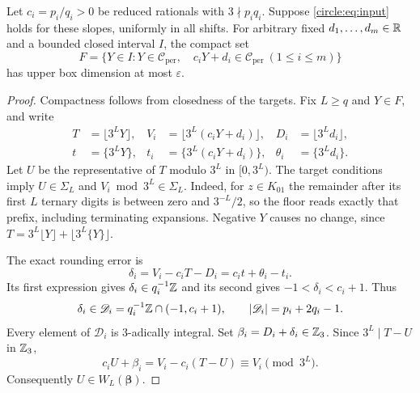 \begin{lemma}\label{circle:lem:transfer}
Let $c_i=p_i/q_i>0$ be reduced rationals with $3\nmid p_iq_i$.
Suppose \eqref{circle:eq:input} holds for these slopes, uniformly in
all shifts. For arbitrary fixed $d_1,\ldots,d_m\in\mathbb R$ and a bounded
closed interval $I$, the compact set
\[
 F=\{Y\in I:Y\in\mathcal C_{\mathrm{per}},\quad
             c_iY+d_i\in\mathcal C_{\mathrm{per}}\ (1\le i\le m)\}
\]
has upper box dimension at most $\varepsilon$.
\end{lemma}

\begin{proof}
Compactness follows from closedness of the targets. Fix $L\ge q$ and
$Y\in F$, and write
\begin{align*}
 T&=\lfloor3^LY\rfloor,&
 V_i&=\lfloor3^L(c_iY+d_i)\rfloor,&D_i&=\lfloor3^Ld_i\rfloor,\\
 t&=\{3^LY\},&t_i&=\{3^L(c_iY+d_i)\},&\theta_i&=\{3^Ld_i\}.
\end{align*}
Let $U$ be the representative of $T$ modulo $3^L$ in $[0,3^L)$.
The target conditions imply
$U\in\Sigma_L$ and $V_i\bmod 3^L\in\Sigma_L$.
Indeed, for $z\in K_{01}$ the remainder after its first $L$ ternary
digits is between zero and $3^{-L}/2$, so the floor reads exactly
that prefix, including terminating expansions. Negative $Y$ causes
no change, since
$T=3^L\lfloor Y\rfloor+\lfloor3^L\{Y\}\rfloor$.

The exact rounding error is
\begin{equation}\label{circle:eq:error}
 \delta_i=V_i-c_iT-D_i=c_it+\theta_i-t_i.
\end{equation}
Its first expression gives $\delta_i\in q_i^{-1}\mathbb Z$ and its second
gives $-1<\delta_i<c_i+1$. Thus
\[
 \delta_i\in\mathscr D_i=q_i^{-1}\mathbb Z\cap(-1,c_i+1),
 \qquad |\mathscr D_i|=p_i+2q_i-1.
\]
Every element of $\mathscr D_i$ is $3$-adically integral. Set
$\beta_i=D_i+\delta_i\in\mathbb Z_3$. Since $3^L\mid T-U$ in $\mathbb Z_3$,
\begin{equation}\label{circle:eq:congruence}
              c_iU+\beta_i=V_i-c_i(T-U)\equiv V_i\pmod{3^L}.
\end{equation}
Consequently $U\in W_L(\boldsymbol\beta)$.


\end{proof}
